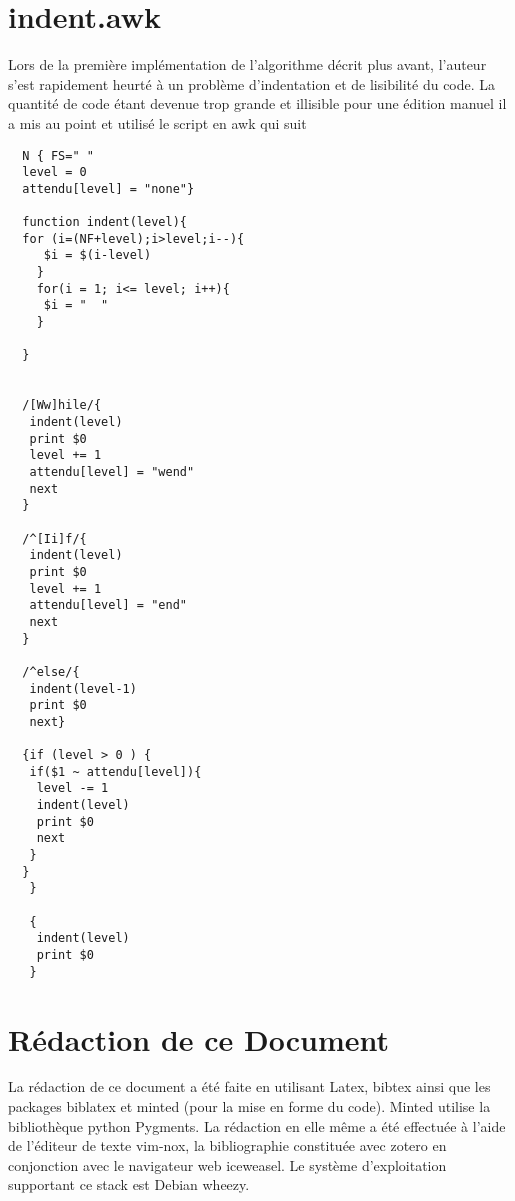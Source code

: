 \documentclass[11pt]{report}
\begin{document}
\section{indent.awk}
Lors de la première implémentation de l'algorithme décrit plus avant, l'auteur s'est rapidement heurté à un problème d'indentation et de lisibilité du code. La quantité de code étant devenue trop grande et illisible pour une édition manuel il a mis au point et utilisé le script en awk qui suit
\begin{verbatim}
  N { FS=" " 
  level = 0
  attendu[level] = "none"}
  
  function indent(level){
  for (i=(NF+level);i>level;i--){
     $i = $(i-level)
    }
    for(i = 1; i<= level; i++){
     $i = "  "
    }
  
  }
  
  
  /[Ww]hile/{
   indent(level)
   print $0
   level += 1
   attendu[level] = "wend"
   next
  }
  
  /^[Ii]f/{
   indent(level)
   print $0
   level += 1
   attendu[level] = "end"
   next
  }
  
  /^else/{
   indent(level-1)
   print $0
   next}
  
  {if (level > 0 ) {
   if($1 ~ attendu[level]){
    level -= 1
    indent(level)
    print $0
    next
   }
  }
   }
  
   {
  	indent(level)
  	print $0
   }
\end{verbatim}
\section{Rédaction de ce Document}
La rédaction de ce document a été faite en utilisant Latex, bibtex ainsi que les packages biblatex et minted (pour la mise en forme du code).
Minted utilise la bibliothèque python Pygments.
 La rédaction en elle même a été effectuée à l'aide de l'éditeur de texte vim-nox, la bibliographie constituée avec zotero en conjonction avec le navigateur web iceweasel.
 Le système d'exploitation supportant ce stack est Debian wheezy.

\printbibliography
\end{document}

